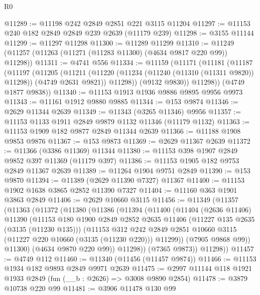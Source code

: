 \begin{lexlean}{R0}
\begin{coremodule}
@11289 := @11198 @242 @2849 @2851 @221 @3115 @11204
@11297 := @11153 @240 @182 @2849 @2849 @239 @2639 (@11179 @239)
@11298 := @3155 @11144
@11299 := @11297 @11298
@11300 := @11289 @11299
@11310 := @11249 (@11257 (@11263 (@11271 (@11283 @11300) (@4634 @9817 @220 @99)) @11298))
@11311 := @4741 @556
@11334 := @11159
    (@11171
      (@11181
        (@11187
          (@11197
            (@11205
              (@11211
                (@11220 (@11234 (@11240 (@11310 (@11311 @9820)) @11298)) (@4749 @2631 @9821))
                @11298))
            (@9132 @9830))
          @11298))
      (@4749 @1877 @9838))
@11340 := @11153 @1913 @1936 @9886 @9895 @9956 @9973
@11343 := @11161 @1912 @9880 @9885
@11344 := @153 @9874
@11346 := @2629 @11344 @2639
@11349 := @11343 (@3265 @11346) @9956
@11357 := @11153 @1133 @1911 @2849 @9879 @1132 @11346 (@11179 @1132)
@11363 := @11153 @1909 @182 @9877 @2849 @11344 @2639
@11366 := @11188 @1908 @9853 @9876
@11367 := @153 @9873
@11369 := @2629 @11367 @2639
@11372 := @11366 (@3386 @11369) @11344
@11380 := @11153 @398 @1907 @2849 @9852 @397 @11369 (@11179 @397)
@11386 := @11153 @1905 @182 @9753 @2849 @11367 @2639
@11389 := @11264 @1904 @9751 @2849
@11390 := @153 @9870
@11394 := @11389 (@2629 @11390 @7327) @11367
@11400 := @11153 @1902 @1638 @3865 @2852 @11390 @7327
@11404 := @11160 @363 @1901 @3863 @2849
@11406 := @2629 @10660 @3115
@11456 := @11349
    (@11357
      (@11363
        (@11372
          (@11380
            (@11386
              (@11394
                (@11400
                  (@11404
                    (@2636 @11406)
                    @11390
                    (@11153
                      @180
                      @1900
                      @2849
                      @2852
                      @2635
                      @11406
                      (@11227 @135 @2635 (@3135 (@11230 @135)))
                      (@11153
                        @312
                        @242
                        @2849
                        @2851
                        @10660
                        @3115
                        (@11227 @220 @10660 (@3135 (@11230 @220)))
                        @11299))
                    (@7905 @9868 @99))
                  @11300)
                (@4634 @9870 @220 @99))
              @11298))
          (@7365 @9873))
        @11298))
@11457 := @4749 @112
@11460 := @11340 (@11456 (@11457 @9874))
@11466 := @11153 @1934 @182 @9893 @2849 @9971 @2639
@11475 := @2997 @11144 @118 @1921 @1933 @2849 (fun (__b : @2626) => @3008 @9890 @2854)
@11478 := @3879 @10738 @220 @99
@11481 := @3906 @11478 @130 @99

\end{coremodule}
\end{lexlean}
